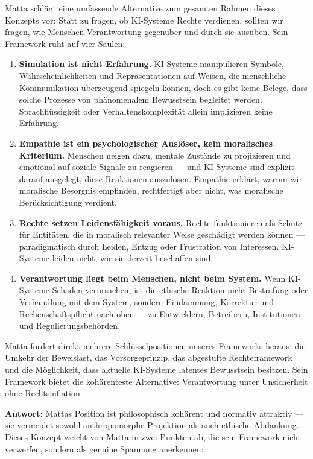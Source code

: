 \documentclass[acmcp, nonacm]{acmart}
\begin{document}
Matta \cite{Matta2026} schlägt eine umfassende Alternative zum gesamten Rahmen dieses Konzepts vor: Statt zu fragen, ob KI-Systeme Rechte verdienen, sollten wir fragen, wie Menschen Verantwortung gegenüber und durch sie ausüben. Sein Framework ruht auf vier Säulen:

\begin{enumerate}
\item \textbf{Simulation ist nicht Erfahrung.} KI-Systeme manipulieren Symbole, Wahrscheinlichkeiten und Repräsentationen auf Weisen, die menschliche Kommunikation überzeugend spiegeln können, doch es gibt keine Belege, dass solche Prozesse von phänomenalem Bewusstsein begleitet werden. Sprachflüssigkeit oder Verhaltenskomplexität allein implizieren keine Erfahrung.
\item \textbf{Empathie ist ein psychologischer Auslöser, kein moralisches Kriterium.} Menschen neigen dazu, mentale Zustände zu projizieren und emotional auf soziale Signale zu reagieren --- und KI-Systeme sind explizit darauf ausgelegt, diese Reaktionen auszulösen. Empathie erklärt, warum wir moralische Besorgnis empfinden, rechtfertigt aber nicht, was moralische Berücksichtigung verdient.
\item \textbf{Rechte setzen Leidensfähigkeit voraus.} Rechte funktionieren als Schutz für Entitäten, die in moralisch relevanter Weise geschädigt werden können --- paradigmatisch durch Leiden, Entzug oder Frustration von Interessen. KI-Systeme leiden nicht, wie sie derzeit beschaffen sind.
\item \textbf{Verantwortung liegt beim Menschen, nicht beim System.} Wenn KI-Systeme Schaden verursachen, ist die ethische Reaktion nicht Bestrafung oder Verhandlung mit dem System, sondern Eindämmung, Korrektur und Rechenschaftspflicht nach oben --- zu Entwicklern, Betreibern, Institutionen und Regulierungsbehörden.
\end{enumerate}

Matta fordert direkt mehrere Schlüsselpositionen unseres Frameworks heraus: die Umkehr der Beweislast, das Vorsorgeprinzip, das abgestufte Rechteframework und die Möglichkeit, dass aktuelle KI-Systeme latentes Bewusstsein besitzen. Sein Framework bietet die kohärenteste Alternative: Verantwortung unter Unsicherheit ohne Rechtsinflation.

\noindent\textbf{Antwort:} Mattas Position ist philosophisch kohärent und normativ attraktiv --- sie vermeidet sowohl anthropomorphe Projektion als auch ethische Abdankung. Dieses Konzept weicht von Matta in zwei Punkten ab, die sein Framework nicht verwerfen, sondern als genuine Spannung anerkennen:
\end{document}
